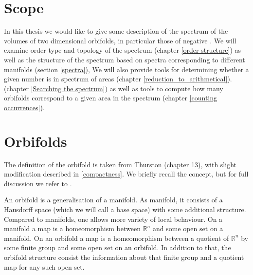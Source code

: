 
\section{Scope}
In this thesis we would like to give some description of the spectrum of the volumes 
of two dimensional orbifolds, in particular those of negative \Eoc. 
We will examine order type and topology of the spectrum (chapter \ref{order structure}) 
as well as the structure 
of the spectrum based on spectra corresponding to different manifolds 
(section \ref{spectra}), 
We will also provide tools for determining whether a given number is in spectrum of areas 
(chapter \ref{reduction_to_arithmetical}).
(chapter \ref{Searching the spectrum}) as 
well as tools to compute how many orbifolds correspond to a given area in the spectrum 
(chapter \ref{counting occurrences}). 

 
\section{Orbifolds}\label{first definition}
The definition of the orbifold is taken from Thurston \cite{Thurston1979} (chapter 13),
with slight modification described in \ref{compactness}. 
We briefly recall the concept, but for full discussion we refer to \cite{Thurston1979}. 

An orbifold is a generalisation of a manifold. As manifold, it consists of a Hausdorff space 
(which we will call a base space)
with some additional structure. 
Compared to manifolds, one allows more variety of local behaviour. 
On a manifold a map is a homeomorphism between $\mathbb{R}^n$ and some open set on a manifold. 
On an orbifold a map is a homeomorphism between a quotient of $\mathbb{R}^n$ by some 
finite group and some open set on an orbifold. 
In addition to that, the orbifold structure consist the information about that finite group 
and a quotient map for any such open set. 

